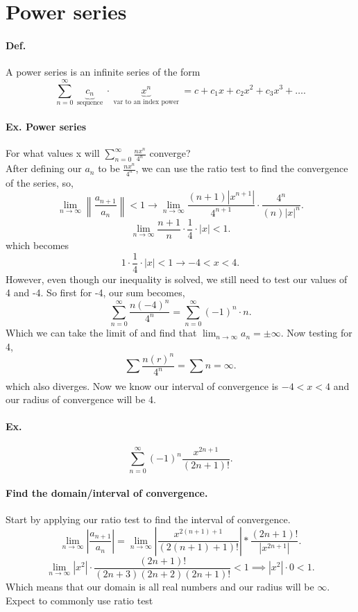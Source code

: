 \section*{Power series}%
\label{sec:Power series}

\paragraph{Def.}
A power series is an infinite series of the form 
\[
\sum_{ n=0 } ^{ \infty } \underbrace{ c_n }_{ \text{ sequence } } \cdot  \underbrace{ x^{ n } }_{ \text{ var to an index power } } = c+ c_1x+ c_2x^2+ c_3x^3+ \ldots
.\] 
\paragraph{Ex. Power series}
For what values x will $ \sum_{ n=0 } ^{ \infty } \frac{ nx^{ n } }{ 4^{ n } }$ converge? \\
After defining our $ a_n $ to be $ \frac{ nx^{ n } }{ 4^{ n } } $, we can use the ratio test to find the convergence of the series, so,
\[
\lim_{ n \to \infty} \left\| \frac{ a_{ n+1 } }{ a_n } \right\| < 1 \to \lim_{ n \to \infty} \frac{ \left( n+1 \right) |x^{ n+1 }| }{ 4^{ n+1 } }\cdot \frac{ 4^{ n } }{ \left( n \right) |x|^{ n } }
.\] 
\[
\lim_{ n \to \infty} \frac{ n+1 }{ n }\cdot \frac{ 1 }{ 4 } \cdot \left| x \right| < 1
.\] 
which becomes
\[
1\cdot \frac{ 1 }{ 4 } \cdot \left| x \right| < 1 \to -4 < x < 4
.\] 
However, even though our inequality is solved, we still need to test our values of 4 and -4. So first for -4, our sum becomes,
\[
\sum_{ n=0 } ^{ \infty } \frac{ n\left( -4 \right) ^{ n } }{ 4^{ n } }= \sum_{ n=0 } ^{ \infty } \left( -1 \right) ^{ n }\cdot n
.\] 
Which we can take the limit of and find that $ \lim_{ n \to \infty} a_n = \pm \infty $. Now testing for 4, 
\[
\sum_{  } ^{  } \frac{ n\left( r \right) ^{ n } }{ 4^{ n } }= \sum_{  } ^{  } n  = \infty
.\] 
which also diverges. Now we know our interval of convergence is $ -4 < x < 4 $ and our radius of convergence will be 4.

\paragraph{Ex.}
\[
\sum_{ n=0 } ^{ \infty } \left( -1 \right) ^{ n } \frac{ x^{ 2n+1 } }{ \left( 2n+1 \right) ! }
.\] 
\paragraph{Find the domain/interval of convergence.}
Start by applying our ratio test to find the interval of convergence.
\[
\lim_{ n \to \infty} \left| \frac{ a_{ n+1 } }{ a_n } \right|= \lim_{ n \to \infty} \left| \frac{ x^{ 2\left( n+1 \right) +1 } }{ \left( 2\left( n+1 \right) +1 \right) ! } \right| * \frac{ \left( 2n+1 \right) ! }{ \left| x^{ 2n+1 } \right| }
.\] 
\[
\lim_{ n \to \infty} \left| x^2 \right|\cdot \frac{ \left( 2n+1 \right) !}{ \left( 2n+3 \right) \left( 2n+2 \right) \left( 2n+1 \right) ! } < 1 \implies \left| x^2 \right|\cdot 0< 1 
.\] 
Which means that our domain is all real numbers and our radius will be $ \infty $. Expect to commonly use ratio test

